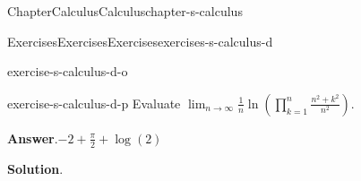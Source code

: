 \documentclass[oneside,10pt,]{book}
\newcommand{\blocktitlefont}{\relax}
\numberwithin{equation}{section}
\begin{document}
\begin{chapterptx}{Chapter}{Calculus}{}{Calculus}{}{}{chapter-s-calculus}
\begin{exercises-section}{Exercises}{Exercises}{}{Exercises}{}{}{exercises-s-calculus-d}
\begin{divisionexercise}{14}{}{}{exercise-s-calculus-d-o}
\end{divisionexercise}%
\begin{divisionexercise}{15}{}{}{exercise-s-calculus-d-p}%
Evaluate \(\lim_{n \rightarrow \infty} \frac{1}{n}\ln \left(\prod_{k=1}^{n} \frac{ n^2+k^2}{n^2}\right)\).%
\par\smallskip%
\noindent\textbf{\blocktitlefont Answer}.\hypertarget{answer-s-calculus-d-p-b}{}\quad{}\(-2+\frac{\pi }{2}+\log (2)\)%
\par\smallskip%
\noindent\textbf{\blocktitlefont Solution}.\hypertarget{solution-s-calculus-d-p-c}{}\quad{}%
\end{divisionexercise}%
\end{exercises-section}
\end{chapterptx}
%
%
\typeout{************************************************}
\typeout{************************************************}
%
\end{document}
